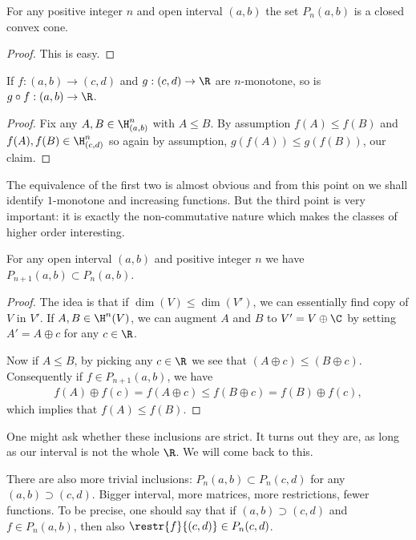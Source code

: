 \begin{prop}
	For any positive integer $n$ and open interval $(a, b)$ the set $P_{n}(a, b)$ is a closed convex cone.
\end{prop}

\begin{proof}
	This is easy.
\end{proof}


\begin{prop}
	If $f : (a, b) \to (c, d)$ and $g : (c, d) \to \R$ are $n$-monotone, so is $g \circ f : (a, b) \to \R$.
\end{prop}
\begin{proof}
	Fix any $A, B \in \H^{n}_{(a, b)}$ with $A \leq B$. By assumption $f(A) \leq f(B)$ and $f(A), f(B) \in \H^{n}_{(c, d)}$ so again by assumption, $g(f(A)) \leq g(f(B))$, our claim.
\end{proof}

The equivalence of the first two is almost obvious and from this point on we shall identify $1$-monotone and increasing functions. But the third point is very important: it is exactly the non-commutative nature which makes the classes of higher order interesting.

\begin{prop}
	For any open interval $(a, b)$ and positive integer $n$ we have $P_{n + 1}(a, b) \subset P_{n}(a, b)$.
\end{prop}
\begin{proof}
	The idea is that if $\dim(V) \leq \dim(V')$, we can essentially find copy of $V$ in $V'$. If $A, B \in \H^{n}(V)$, we can augment $A$ and $B$ to $V' = V \oplus \C$ by setting $A' = A \oplus c$ for any $c \in \R$.

	Now if $A \leq B$, by picking any $c \in \R$ we see that $(A \oplus c) \leq (B \oplus c)$. Consequently if $f \in P_{n + 1}(a, b)$, we have
	\begin{align*}
		f(A) \oplus f(c) = f(A \oplus c) \leq f(B \oplus c) = f(B) \oplus f(c),
	\end{align*}
	which implies that $f(A) \leq f(B)$.
\end{proof}

One might ask whether these inclusions are strict. It turns out they are, as long as our interval is not the whole $\R$. We will come back to this.

There are also more trivial inclusions: $P_{n}(a, b) \subset P_{n}(c, d)$ for any $(a, b) \supset (c, d)$. Bigger interval, more matrices, more restrictions, fewer functions. To be precise, one should say that if $(a, b) \supset (c, d)$ and $f \in P_{n}(a, b)$, then also $\restr{f}{(c, d)} \in P_{n}(c, d)$.

